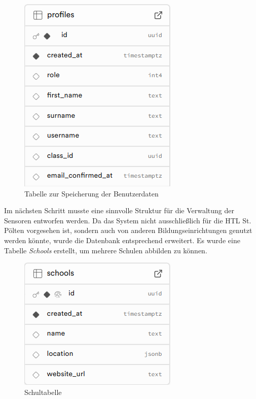 \begin{inhalt}
\begin{figure}[!htb]
  \centering
  \includegraphics[scale=0.5]{files/Thomas/pics/Datenbank_Design/profiles.png}
  \caption[Benutzertabelle der Datenbank]{Tabelle zur Speicherung der Benutzerdaten}
  \label{fig:profiles_tabelle}
\end{figure}

Im nächsten Schritt musste eine sinnvolle Struktur für die Verwaltung der Sensoren entworfen werden. Da das System nicht ausschließlich für die HTL St. Pölten vorgesehen ist, sondern auch von anderen Bildungseinrichtungen genutzt werden könnte, wurde die Datenbank entsprechend erweitert. Es wurde eine Tabelle \textit{Schools} erstellt, um mehrere Schulen abbilden zu können.

\begin{figure}[!htb]
  \centering
  \includegraphics[scale=0.5]{files/Thomas/pics/Datenbank_Design/school.png}
  \caption[Schultabelle der Datenbank]{Schultabelle}
  \label{fig:schools_tabelle}
\end{figure}


\end{inhalt}
